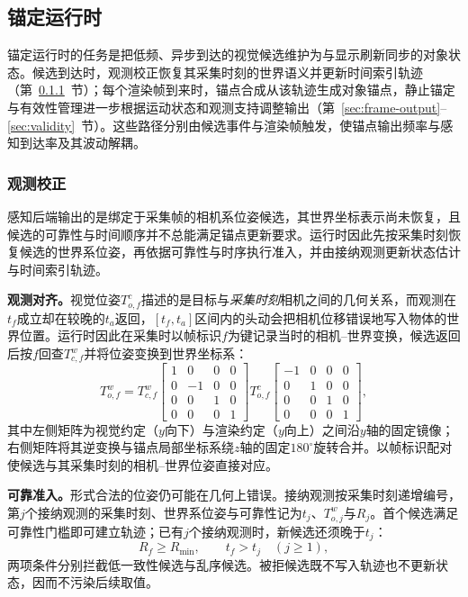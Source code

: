 \documentclass[review]{vgtc}
\begin{document}
\subsection{锚定运行时}\label{sec:anchoring}

锚定运行时的任务是把低频、异步到达的视觉候选维护为与显示刷新同步的对象状态。候选到达时，观测校正恢复其采集时刻的世界语义并更新时间索引轨迹（第~\ref{sec:obs-update}~节）；每个渲染帧到来时，锚点合成从该轨迹生成对象锚点，静止锚定与有效性管理进一步根据运动状态和观测支持调整输出（第~\ref{sec:frame-output}--\ref{sec:validity}~节）。这些路径分别由候选事件与渲染帧触发，使锚点输出频率与感知到达率及其波动解耦。

\subsubsection{观测校正}\label{sec:obs-update}

感知后端输出的是绑定于采集帧的相机系位姿候选，其世界坐标表示尚未恢复，且候选的可靠性与时间顺序并不总能满足锚点更新要求。运行时因此先按采集时刻恢复候选的世界系位姿，再依据可靠性与时序执行准入，并由接纳观测更新状态估计与时间索引轨迹。

\textbf{观测对齐。}视觉位姿$T_{o,f}^{c}$描述的是目标与\emph{采集时刻}相机之间的几何关系，而观测在$t_f$成立却在较晚的$t_a$返回，$[t_f, t_a]$区间内的头动会把相机位移错误地写入物体的世界位置。运行时因此在采集时以帧标识$f$为键记录当时的相机--世界变换，候选返回后按$f$回查$T_{c,f}^{w}$并将位姿变换到世界坐标系：
\begin{equation}
T_{o,f}^{w} = T_{c,f}^{w}
\begin{bmatrix}
1 & 0 & 0 & 0 \\
0 & -1 & 0 & 0 \\
0 & 0 & 1 & 0 \\
0 & 0 & 0 & 1
\end{bmatrix}
T_{o,f}^{c}
\begin{bmatrix}
-1 & 0 & 0 & 0 \\
0 & 1 & 0 & 0 \\
0 & 0 & 1 & 0 \\
0 & 0 & 0 & 1
\end{bmatrix},
\label{eq:capture-alignment}
\end{equation}
其中左侧矩阵为视觉约定（$y$向下）与渲染约定（$y$向上）之间沿$y$轴的固定镜像；右侧矩阵将其逆变换与锚点局部坐标系绕$z$轴的固定$180^\circ$旋转合并。以帧标识配对使候选与其采集时刻的相机--世界位姿直接对应。

\textbf{可靠准入。}形式合法的位姿仍可能在几何上错误。接纳观测按采集时刻递增编号，第$j$个接纳观测的采集时刻、世界系位姿与可靠性记为$t_j$、$T_{o,j}^{w}$与$R_j$。首个候选满足可靠性门槛即可建立轨迹；已有$j$个接纳观测时，新候选还须晚于$t_j$：
\begin{equation}
R_f \geq R_{\min}, \qquad t_f > t_j \quad (j \geq 1),
\label{eq:admission}
\end{equation}
两项条件分别拦截低一致性候选与乱序候选。被拒候选既不写入轨迹也不更新状态，因而不污染后续取值。
\end{document}
